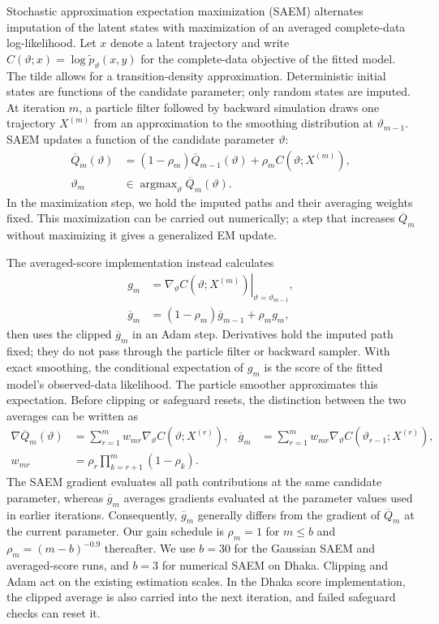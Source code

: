 \documentclass[11pt]{article}
\theoremstyle{thmstylethree}%
\begin{document}
Stochastic approximation expectation maximization (SAEM) alternates
imputation of the latent states with maximization of an averaged
complete-data log-likelihood.
Let $x$ denote a latent trajectory and write
$C(\vartheta;x)=\log\widetilde p_\vartheta(x,y)$ for the complete-data
objective of the fitted model. The tilde allows for a transition-density
approximation. Deterministic initial states are functions of the candidate
parameter; only random states are imputed. At iteration $m$, a particle
filter followed by backward
simulation draws one trajectory $X^{(m)}$ from an approximation to the
smoothing distribution at $\vartheta_{m-1}$.
SAEM updates a function of the candidate parameter $\vartheta$:
\begin{align}
 \overline Q_m(\vartheta)
 &= (1-\rho_m)\overline Q_{m-1}(\vartheta)
       +\rho_m C(\vartheta;X^{(m)}),
 \label{eq:benchmark-saem-q}\\
 \vartheta_m &\in
       \mathop{\mathrm{argmax}}_{\vartheta}\overline Q_m(\vartheta).
 \label{eq:benchmark-saem-m}
\end{align}
In the maximization step, we hold the imputed paths and their averaging
weights fixed. This maximization can be carried out numerically; a step
that increases $\overline Q_m$ without maximizing it gives a generalized
EM update.

The averaged-score implementation instead calculates
\begin{align}
 g_m &= \left.\nabla_\vartheta C(\vartheta;X^{(m)})
                         \right|_{\vartheta=\vartheta_{m-1}},
 \label{eq:benchmark-path-score}\\
 \overline g_m &=(1-\rho_m)\overline g_{m-1}+\rho_m g_m,
 \label{eq:benchmark-score-average}
\end{align}
then uses the clipped $\overline g_m$ in an Adam step.
Derivatives hold the imputed path fixed; they do not pass through the
particle filter or backward sampler.
With exact smoothing, the conditional expectation of $g_m$ is the score
of the fitted model's observed-data likelihood.
The particle smoother approximates this expectation.
Before clipping or safeguard resets, the distinction between the two
averages can be written as
\begin{align}
 \nabla\overline Q_m(\vartheta)
   &=\sum_{r=1}^m w_{mr}\nabla_\vartheta C(\vartheta;X^{(r)}),
 &\overline g_m
   &=\sum_{r=1}^m w_{mr}
       \nabla_\vartheta C(\vartheta_{r-1};X^{(r)}),
 \label{eq:benchmark-q-versus-score}\\
 w_{mr}&=\rho_r\prod_{k=r+1}^m(1-\rho_k).\nonumber
\end{align}
The SAEM gradient evaluates all path contributions at the same candidate
parameter, whereas $\overline g_m$ averages gradients evaluated at the
parameter values used in earlier iterations. Consequently,
$\overline g_m$ generally differs from the gradient of $\overline Q_m$
at the current parameter.
Our gain schedule is $\rho_m=1$ for $m\leq b$ and
$\rho_m=(m-b)^{-0.9}$ thereafter.
We use $b=30$ for the Gaussian SAEM and averaged-score runs, and $b=3$
for numerical SAEM on Dhaka.
Clipping and Adam act on the existing estimation scales.
In the Dhaka score implementation, the clipped average is also carried
into the next iteration, and failed safeguard checks can reset it.
\end{document}
